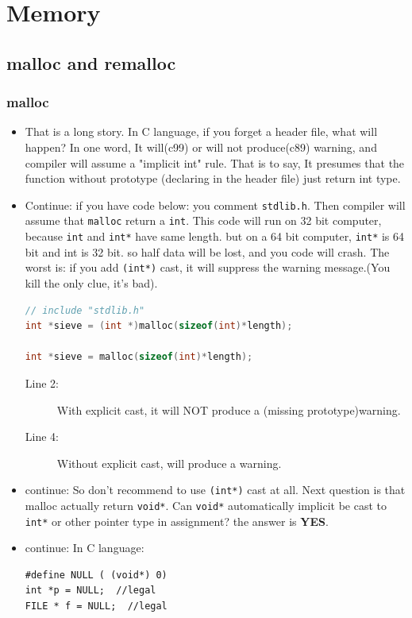 \documentclass[a4paper,11pt,twoside]{book}
\begin{document}
\chapter{Memory}

\section{malloc and remalloc}
\subsection{malloc}
\begin{itemize}
	\item That is a long story. In C language, if you forget a header file, what will happen? In one word, It will(c99) or will not produce(c89) warning, and compiler will assume a "implicit int" rule. That is to say, It presumes that the function without prototype (declaring in the header file) just return int type.
	
	\item Continue: if you have code below: you comment \texttt{stdlib.h}. Then compiler will assume that \texttt{malloc} return a \texttt{int}.  This code will run on 32 bit computer, because \texttt{int} and \texttt{int*} have same length. but on a 64 bit computer, \texttt{int*} is 64 bit and int is 32 bit.  so half data will be lost, and you code will crash. The worst is: if you add \texttt{(int*)} cast, it will suppress the warning message.(You kill the only clue, it's bad).
\begin{lstlisting}[frame=single, language=c++]
// include "stdlib.h"
int *sieve = (int *)malloc(sizeof(int)*length);
	
int *sieve = malloc(sizeof(int)*length);
\end{lstlisting}
\begin{description}
	\item[Line 2:] With explicit cast, it will NOT produce a (missing prototype)warning.
	\item[Line 4:] Without explicit cast, will produce a warning.
\end{description}

	\item continue: So don't recommend to use \texttt{(int*)} cast at all. Next question is that malloc actually return \texttt{void*}. Can \texttt{void*} automatically implicit be cast to \texttt{int*} or other pointer type in assignment? the answer is \textbf{YES}.
	
	\item  continue: In C language:
\begin{lstlisting}[numbers=none]
#define NULL ( (void*) 0)
int *p = NULL;  //legal
FILE * f = NULL;  //legal
\end{lstlisting}
	

\end{itemize}
\end{document}
